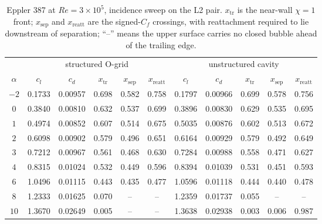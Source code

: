\begin{table}[tp]
  \centering\small
  \caption{Eppler 387 at $Re\!=\!3\!\times\!10^5$, incidence sweep on the L2 pair. $x_\mathrm{tr}$ is the near-wall $\chi\!=\!1$ front; $x_\mathrm{sep}$ and $x_\mathrm{reatt}$ are the signed-$C_f$ crossings, with reattachment required to lie downstream of separation; ``--'' means the upper surface carries no closed bubble ahead of the trailing edge.}
  \label{tab:extepp300k}
  \begin{tabular}{c ccccc ccccc}
    \toprule
    & \multicolumn{5}{c}{structured O-grid} & \multicolumn{5}{c}{unstructured cavity} \\
    \cmidrule(lr){2-6}\cmidrule(lr){7-11}
    $\alpha$ & $c_l$ & $c_d$ & $x_\mathrm{tr}$ & $x_\mathrm{sep}$ & $x_\mathrm{reatt}$
             & $c_l$ & $c_d$ & $x_\mathrm{tr}$ & $x_\mathrm{sep}$ & $x_\mathrm{reatt}$ \\
    \midrule
    $-2$ & 0.1733 & 0.00957 & 0.698 & 0.582 & 0.758 & 0.1797 & 0.00966 & 0.699 & 0.578 & 0.756 \\
    $0$ & 0.3840 & 0.00810 & 0.632 & 0.537 & 0.699 & 0.3896 & 0.00830 & 0.629 & 0.535 & 0.695 \\
    $1$ & 0.4974 & 0.00852 & 0.607 & 0.514 & 0.675 & 0.5035 & 0.00876 & 0.602 & 0.513 & 0.672 \\
    $2$ & 0.6098 & 0.00902 & 0.579 & 0.496 & 0.651 & 0.6164 & 0.00929 & 0.579 & 0.492 & 0.649 \\
    $3$ & 0.7212 & 0.00967 & 0.561 & 0.468 & 0.630 & 0.7284 & 0.00988 & 0.558 & 0.471 & 0.627 \\
    $4$ & 0.8315 & 0.01024 & 0.532 & 0.449 & 0.596 & 0.8394 & 0.01039 & 0.531 & 0.451 & 0.593 \\
    $6$ & 1.0496 & 0.01115 & 0.443 & 0.435 & 0.477 & 1.0596 & 0.01118 & 0.444 & 0.440 & 0.478 \\
    $8$ & 1.2333 & 0.01625 & 0.070 & -- & -- & 1.2359 & 0.01737 & 0.055 & -- & -- \\
    $10$ & 1.3670 & 0.02649 & 0.005 & -- & -- & 1.3638 & 0.02938 & 0.003 & 0.006 & 0.987 \\
    \bottomrule
  \end{tabular}
\end{table}
